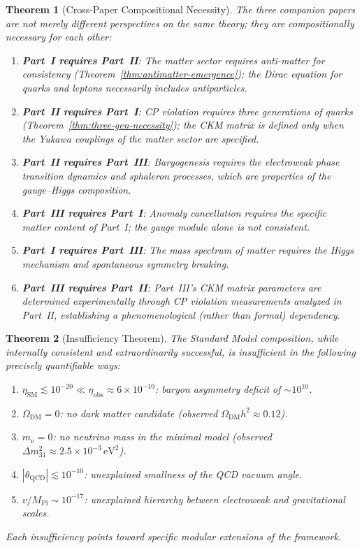 \documentclass[12pt]{article}
\newtheorem{theorem}{Theorem}[section]
\theoremstyle{definition}
\theoremstyle{remark}
\newcommand{\Mpl}{M_{\mathrm{Pl}}}
\begin{document}
\begin{theorem}[Cross-Paper Compositional Necessity]
\label{thm:cross-paper}
The three companion papers are not merely different perspectives on the same theory; they are compositionally necessary for each other:
\begin{enumerate}
\item \textbf{Part~I requires Part~II}: The matter sector requires anti-matter for consistency (Theorem~\ref{thm:antimatter-emergence}); the Dirac equation for quarks and leptons necessarily includes antiparticles.
\item \textbf{Part~II requires Part~I}: CP violation requires three generations of quarks (Theorem~\ref{thm:three-gen-necessity}); the CKM matrix is defined only when the Yukawa couplings of the matter sector are specified.
\item \textbf{Part~II requires Part~III}: Baryogenesis requires the electroweak phase transition dynamics and sphaleron processes, which are properties of the gauge--Higgs composition.
\item \textbf{Part~III requires Part~I}: Anomaly cancellation requires the specific matter content of Part~I; the gauge module alone is not consistent.
\item \textbf{Part~I requires Part~III}: The mass spectrum of matter requires the Higgs mechanism and spontaneous symmetry breaking.
\item \textbf{Part~III requires Part~II}: Part~III's CKM matrix parameters are determined experimentally through CP violation measurements analyzed in Part~II, establishing a \emph{phenomenological} (rather than formal) dependency.
\end{enumerate}
\end{theorem}

\begin{theorem}[Insufficiency Theorem]
\label{thm:insufficiency}
The Standard Model composition, while internally consistent and extraordinarily successful, is insufficient in the following precisely quantifiable ways:
\begin{enumerate}
\item $\eta_{\mathrm{SM}} \lesssim 10^{-20} \ll \eta_{\mathrm{obs}} \approx 6 \times 10^{-10}$: baryon asymmetry deficit of $\sim 10^{10}$.
\item $\Omega_{\mathrm{DM}} = 0$: no dark matter candidate (observed $\Omega_{\mathrm{DM}}h^2 \approx 0.12$).
\item $m_\nu = 0$: no neutrino mass in the minimal model (observed $\Delta m^2_{31} \approx 2.5 \times 10^{-3}\,\mathrm{eV}^2$).
\item $|\theta_{\mathrm{QCD}}| \lesssim 10^{-10}$: unexplained smallness of the QCD vacuum angle.
\item $v/\Mpl \sim 10^{-17}$: unexplained hierarchy between electroweak and gravitational scales.
\end{enumerate}
Each insufficiency points toward specific modular extensions of the framework.
\end{theorem}
\end{document}
